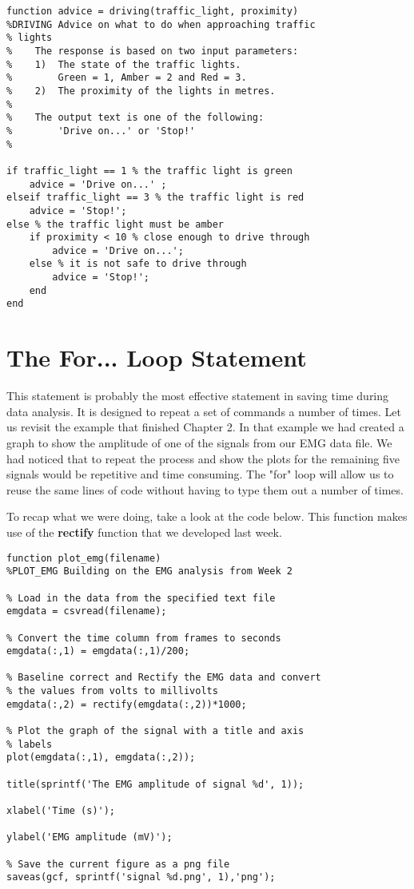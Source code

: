 \documentclass[12pt,a4paper]{article}
\begin{document}
\begin{lstlisting}[style=Matlab-editor]
function advice = driving(traffic_light, proximity)
%DRIVING Advice on what to do when approaching traffic 
% lights
%    The response is based on two input parameters:
%    1)  The state of the traffic lights.
%        Green = 1, Amber = 2 and Red = 3.
%    2)  The proximity of the lights in metres.
%
%    The output text is one of the following:
%        'Drive on...' or 'Stop!'
%

if traffic_light == 1 % the traffic light is green
    advice = 'Drive on...' ;
elseif traffic_light == 3 % the traffic light is red
    advice = 'Stop!';
else % the traffic light must be amber
    if proximity < 10 % close enough to drive through
        advice = 'Drive on...';
    else % it is not safe to drive through
        advice = 'Stop!';
    end
end
\end{lstlisting}

\section{The For... Loop Statement}
This statement is probably the most effective statement in saving time during data analysis.  
It is designed to repeat a set of commands a number of times.  
Let us revisit the example that finished Chapter 2.  
In that example we had created a graph to show the amplitude of one of the signals from our EMG data file.  
We had noticed that to repeat the process and show the plots for the remaining five signals would be repetitive and time consuming.  
The "for" loop will allow us to reuse the same lines of code without having to type them out a number of times.

To recap what we were doing, take a look at the code below.  
This function makes use of the \textbf{rectify} function that we developed last week.

\begin{lstlisting}[style=Matlab-editor]
function plot_emg(filename)
%PLOT_EMG Building on the EMG analysis from Week 2

% Load in the data from the specified text file
emgdata = csvread(filename);

% Convert the time column from frames to seconds
emgdata(:,1) = emgdata(:,1)/200;

% Baseline correct and Rectify the EMG data and convert 
% the values from volts to millivolts
emgdata(:,2) = rectify(emgdata(:,2))*1000;

% Plot the graph of the signal with a title and axis 
% labels
plot(emgdata(:,1), emgdata(:,2));

title(sprintf('The EMG amplitude of signal %d', 1)); 

xlabel('Time (s)');

ylabel('EMG amplitude (mV)');

% Save the current figure as a png file
saveas(gcf, sprintf('signal %d.png', 1),'png');
\end{lstlisting}
\end{document}
